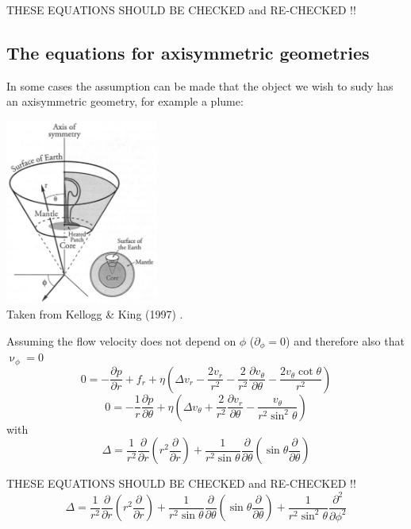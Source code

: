THESE EQUATIONS SHOULD BE CHECKED and RE-CHECKED !!

\subsection{The equations for axisymmetric geometries}

In some cases the assumption can be made that the object we wish to sudy has an 
axisymmetric geometry, for example a plume:

\begin{center}
\includegraphics[width=5cm]{images/axisymmetry/keki97}\\
{\captionfont Taken from Kellogg \& King (1997) \cite{keki97}.}
\end{center}

Assuming the flow velocity does not depend on $\phi$ ($\partial_\phi =0$) and therefore also that $\upnu_\phi=0$
\[
0=-\frac{\partial p}{\partial r} + f_r + \eta \left(\Delta v_r - \frac{2v_r}{r^2} -\frac{2}{r^2} \frac{\partial v_\theta}{\partial \theta} - \frac{2 v_\theta \cot \theta }{r^2} \right)
\]
\[
0 = -\frac{1}{r} \frac{\partial p}{\partial \theta} + \eta \left(\Delta v_\theta + \frac{2}{r^2} \frac{\partial v_r}{\partial \theta}  - \frac{v_\theta}{r^2 \sin^2 \theta} \right)
\]
with
\[
\Delta = \frac{1}{r^2} \frac{\partial }{\partial r}\left( r^2 \frac{\partial }{\partial r}\right)
+\frac{1}{r^2 \sin\theta} \frac{\partial }{\partial \theta}
\left(
\sin\theta \frac{\partial }{\partial\theta}
\right)
\]



\newpage
THESE EQUATIONS SHOULD BE CHECKED and RE-CHECKED !!
\[
\Delta = \frac{1}{r^2} \frac{\partial }{\partial r}\left( r^2 \frac{\partial }{\partial r}\right)
+\frac{1}{r^2 \sin\theta} \frac{\partial }{\partial \theta}
\left(
\sin\theta \frac{\partial }{\partial\theta}
\right)
+ \frac{1}{r^2 \sin^2\theta} \frac{\partial^2 }{\partial\phi^2}
\]

